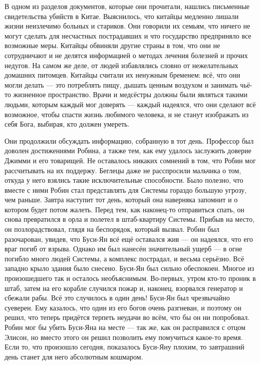 \documentclass[a4paper,12pt]{book}
\begin{document}
	В одном из разделов документов, которые они прочитали, нашлись письменные свидетельства убийств в Китае. Выяснилось, что китайцы медленно лишали жизни неизлечимо больных и стариков. Они говорили их семьям, что ничего не могут сделать для несчастных пострадавших и что государство предприняло все возможные меры. Китайцы обвиняли другие страны в том, что они не сотрудничают и не делятся информацией о методах лечения болезней и прочих недугов. На самом же деле, от людей избавлялись словно от нежелательных домашних питомцев. Китайцы считали их ненужным бременем: всё, что они могли делать — это потреблять пищу, дышать ценным воздухом и занимать чьё-то жизненное пространство. Врачи и медсёстры должны были являться такими людьми, которым каждый мог доверять — каждый надеялся, что они сделают всё возможное, чтобы спасти жизнь любимого человека, и не станут изображать из себя Бога, выбирая, кто должен умереть.

	Они продолжили обсуждать информацию, собранную в тот день. Профессор был доволен достижениями Робина, а также тем, как ему удалось заслужить доверие Джимми и его товарищей. Не оставалось никаких сомнений в том, что Робин мог рассчитывать на их поддержу.
	Беглецы даже не расспросили мальчика о том, откуда у него взялись такие исключительные способности. Было полезно, что вместе с ними Робин стал представлять для Системы гораздо большую угрозу, чем раньше. Завтра наступит тот день, который она наверняка запомнит и о котором будет потом жалеть.
	Перед тем, как наконец-то отправиться спать, он снова превратился в орла и полетел в штаб-квартиру Системы.
	Прибыв на место, он позлорадствовал, глядя на беспорядок, который вызвал. Робин был разочарован, увидев, что Буси-Ян всё ещё оставался жив — он надеялся, что его враг погиб от взрыва. Однако им был нанесён значительный ущерб — в огне погибло много людей Системы, а комплекс пострадал, и весьма серьёзно. Всё западно крыло здания было снесено.
	Буси-Ян был сильно обеспокоен. Многое из произошедшего так и осталось необъяснимым. Во-первых, утром кто-то проник в штаб, затем на его корабле случился пожар и, наконец, взорвался генератор и сбежали рабы. Всё это случилось в один день! Буси-Ян был чрезвычайно суеверен. Ему казалось, что один из его богов очень разгневан, и поэтому он решил, что теперь придётся терпеть неудачи во всём, что бы он ни попробовал.
	Робин мог бы убить Буси-Яна на месте — так же, как он расправился с отцом Элисон, но вместо этого он решил позволить ему помучиться какое-то время. Если то, что произошло сегодня, показалось Буси-Яну плохим, то завтрашний день станет для него абсолютным кошмаром.
\end{document}
